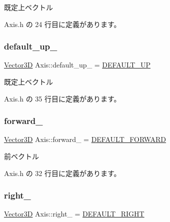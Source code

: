 既定上ベクトル 



 Axis.\+h の 24 行目に定義があります。

\mbox{\label{class_axis_a50d5dc8e7cc5443421948ae81676360f}} 
\subsubsection{\texorpdfstring{default\+\_\+up\+\_\+}{default\_up\_}}
{\footnotesize\ttfamily \mbox{\hyperlink{class_vector3_d}{Vector3D}} Axis\+::default\+\_\+up\+\_\+ = \mbox{\hyperlink{class_axis_afe3787d2e4c4affc0c4ab43a5f52891e}{D\+E\+F\+A\+U\+L\+T\+\_\+\+UP}}\hspace{0.3cm}{\ttfamily [private]}}



既定上ベクトル 



 Axis.\+h の 35 行目に定義があります。

\mbox{\label{class_axis_a9595934289a148d6acbbe65614669115}} 
\subsubsection{\texorpdfstring{forward\+\_\+}{forward\_}}
{\footnotesize\ttfamily \mbox{\hyperlink{class_vector3_d}{Vector3D}} Axis\+::forward\+\_\+ = \mbox{\hyperlink{class_axis_a3360259f8662e72e5d86405647dc0188}{D\+E\+F\+A\+U\+L\+T\+\_\+\+F\+O\+R\+W\+A\+RD}}\hspace{0.3cm}{\ttfamily [private]}}



前ベクトル 



 Axis.\+h の 32 行目に定義があります。

\mbox{\label{class_axis_a10577439f2638a389cc0f7d4f0a8dac8}} 
\subsubsection{\texorpdfstring{right\+\_\+}{right\_}}
{\footnotesize\ttfamily \mbox{\hyperlink{class_vector3_d}{Vector3D}} Axis\+::right\+\_\+ = \mbox{\hyperlink{class_axis_a12c07eb8804a096a9c72d8f6d4abf6f7}{D\+E\+F\+A\+U\+L\+T\+\_\+\+R\+I\+G\+HT}}\hspace{0.3cm}{\ttfamily [private]}}



